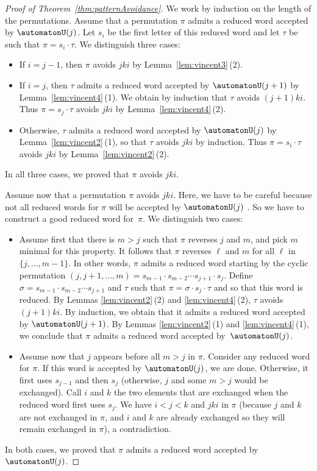 \begin{proof}[Proof of Theorem~\ref{thm:patternAvoidance}]
We work by induction on the length of the permutations.
Assume that a permutation $\pi$ admits a reduced word accepted by $\automatonU(j)$. Let $s_i$ be the first letter of this reduced word and let $\tau$ be such that $\pi = s_i \cdot \tau$. We distinguish three cases:\begin{itemize}
	\item If $i = j-1$, then $\pi$ avoids $jki$ by Lemma~\ref{lem:vincent3}\,(2).
	\item If $i = j$, then $\tau$ admits a reduced word accepted by $\automatonU(j+1)$ by Lemma~\ref{lem:vincent4}\,(1). We obtain by induction that $\tau$ avoids $(j+1)ki$. Thus $\pi = s_j \cdot \tau$ avoids $jki$ by Lemma~\ref{lem:vincent4}\,(2).
	\item Otherwise, $\tau$ admits a reduced word accepted by $\automatonU(j)$ by Lemma~\ref{lem:vincent2}\,(1), so that $\tau$ avoids $jki$ by induction. Thus $\pi = s_i \cdot \tau$ avoids $jki$ by Lemma~\ref{lem:vincent2}\,(2).
\end{itemize}
In all three cases, we proved that $\pi$ avoids $jki$.

Assume now that a permutation $\pi$ avoids $jki$. Here, we have to be careful because not all reduced words for $\pi$ will be accepted by $\automatonU(j)$ \apriori. So we have to construct a good reduced word for~$\pi$. We distinguish two cases:
\begin{itemize}
	\item Assume first that there is $m > j$ such that $\pi$ reverses $j$ and $m$, and pick $m$ minimal for this property. It follows that $\pi$ reverses $\ell$ and $m$ for all $\ell$ in $\{j,\dots,m-1\}$. In other words, $\pi$ admits a reduced word starting by the cyclic permutation $(j, j+1, ..., m) = s_{m-1} \cdot s_{m-2} \cdots s_{j+1} \cdot s_j$. Define ${\sigma = s_{m-1} \cdot s_{m-2}\cdots s_{j+1}}$ and $\tau$ such that $\pi = \sigma \cdot s_j \cdot \tau$ and so that this word is reduced. By Lemmas \ref{lem:vincent2}\,(2) and \ref{lem:vincent4}\,(2), $\tau$ avoids $(j+1)ki$. By induction, we obtain that it admits a reduced word accepted by $\automatonU(j+1)$. By Lemmas \ref{lem:vincent2}\,(1) and \ref{lem:vincent4}\,(1), we conclude that $\pi$ admits a reduced word accepted by~$\automatonU(j)$.
	\item Assume now that $j$ appears before all $m > j$ in $\pi$. Consider any reduced word for $\pi$. If this word is accepted by $\automatonU(j)$, we are done. Otherwise, it first uses $s_{j-1}$ and then $s_j$ (otherwise, $j$ and some $m > j$ would be exchanged). Call $i$ and $k$ the two elements that are exchanged when the reduced word first uses $s_j$. We have $i < j < k$ and $jki$ in $\pi$ (because $j$ and $k$ are not exchanged in $\pi$, and $i$ and $k$ are already exchanged so they will remain exchanged in $\pi$), a contradiction.
\end{itemize}
In both cases, we proved that $\pi$ admits a reduced word accepted by $\automatonU(j)$.
\end{proof}

